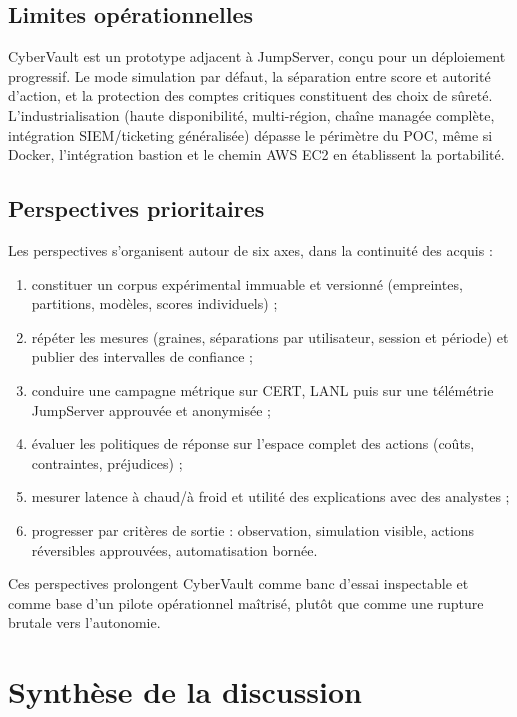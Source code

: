\documentclass[11pt,a4paper,oneside]{report}
\theoremstyle{definition}
\theoremstyle{plain}
\begin{document}
\subsection{Limites opérationnelles}

CyberVault est un prototype adjacent à JumpServer, conçu pour un déploiement progressif. Le mode simulation par défaut, la séparation entre score et autorité d'action, et la protection des comptes critiques constituent des choix de sûreté. L'industrialisation (haute disponibilité, multi-région, chaîne managée complète, intégration SIEM/ticketing généralisée) dépasse le périmètre du POC, même si Docker, l'intégration bastion et le chemin AWS EC2 en établissent la portabilité.

\subsection{Perspectives prioritaires}

Les perspectives s'organisent autour de six axes, dans la continuité des acquis :
\begin{enumerate}[leftmargin=*]
  \item constituer un corpus expérimental immuable et versionné (empreintes, partitions, modèles, scores individuels) ;
  \item répéter les mesures (graines, séparations par utilisateur, session et période) et publier des intervalles de confiance ;
  \item conduire une campagne métrique sur CERT, LANL puis sur une télémétrie JumpServer approuvée et anonymisée ;
  \item évaluer les politiques de réponse sur l'espace complet des actions (coûts, contraintes, préjudices) ;
  \item mesurer latence à chaud/à froid et utilité des explications avec des analystes ;
  \item progresser par critères de sortie : observation, simulation visible, actions réversibles approuvées, automatisation bornée.
\end{enumerate}

Ces perspectives prolongent CyberVault comme banc d'essai inspectable et comme base d'un pilote opérationnel maîtrisé, plutôt que comme une rupture brutale vers l'autonomie.


\section{Synthèse de la discussion}
\end{document}
